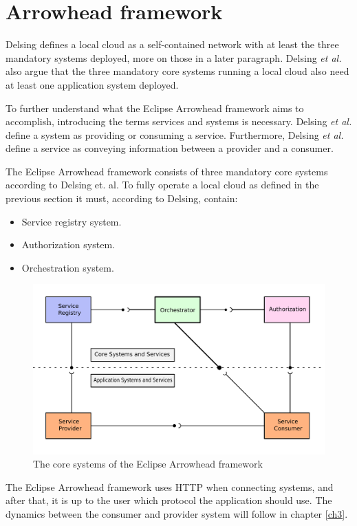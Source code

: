 \section{Arrowhead framework}
Delsing defines a local cloud as a self-contained network with at least the three mandatory systems deployed, more on those in a later paragraph\cite{Delsing2017}. 
Delsing \textit{et al.} also argue that the three mandatory core systems running a local cloud also need at least one application system deployed.

To further understand what the Eclipse Arrowhead framework aims to accomplish, introducing the terms services and systems is necessary.
Delsing \textit{et al.} define a system as providing or consuming a service\cite{Delsing2017}.
Furthermore, Delsing \textit{et al.} define a service as conveying information between a provider and a consumer.

The Eclipse Arrowhead framework consists of three mandatory core systems according to Delsing et. al.
To fully operate a local cloud as defined in the previous section it must, according to Delsing, contain:
\begin{itemize}
    \item Service registry system.
    \item Authorization system. 
    \item Orchestration system.
\end{itemize} 

\begin{figure}[H]
    \centering
    \includegraphics[width=\textwidth]{Pictures/ah.pdf} 
    \caption{The core systems of the Eclipse Arrowhead framework}
    \label{diagram arrowhead}
\end{figure}
The Eclipse Arrowhead framework uses HTTP when connecting systems, and after that, it is up to the user which protocol the application should use.
The dynamics between the consumer and provider system will follow in chapter \ref{ch3}.
